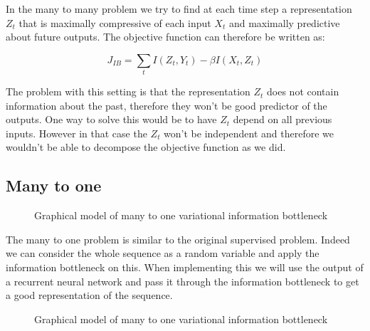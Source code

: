 \documentclass[10pt,oneside,openright]{report}
\begin{document}
In the many to many problem we try to find at each time step a representation $Z_t$ that is maximally compressive of each input $X_t$ and maximally predictive about future outputs. The objective function can therefore be written as:

$$ J_{IB} = \sum_t I(Z_t, Y_{t}) - \beta I(X_{t}, Z_t)$$
 
 The problem with this setting is that the representation $Z_t$ does not contain information about the past, therefore they won't be good predictor of the outputs. One way to solve this would be to have $Z_t$ depend on all previous inputs. However in that case the $Z_t$ won't be independent and therefore we wouldn't be able to decompose the objective function as we did.
 
\subsection{Many to one}

\begin{figure}[H]
\centering
{}
\caption{Graphical model of many to one variational information bottleneck}
\end{figure}

The many to one problem is similar to the original supervised problem. Indeed we can consider the whole sequence as a random variable and apply the information bottleneck on this. When implementing this we will use the output of a recurrent neural network and pass it through the information bottleneck to get a good representation of the sequence. 

\begin{figure}[H]
\centering
{}
\caption{Graphical model of many to one variational information bottleneck }
\end{figure}
\end{document}
